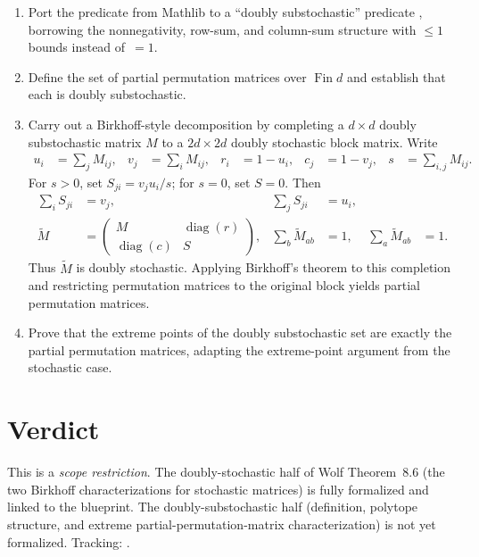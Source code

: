 \documentclass{article}
\begin{document}
\begin{enumerate}
  \item Port the predicate  from Mathlib to a
    ``doubly substochastic'' predicate , borrowing
    the nonnegativity, row-sum, and column-sum structure with $\le 1$ bounds
    instead of~$=1$.
  \item Define the set of partial permutation matrices over
    $\operatorname{Fin} d$ and establish that each is doubly substochastic.
  \item Carry out a Birkhoff-style decomposition by completing a
    $d\times d$ doubly substochastic matrix $M$ to a $2d\times 2d$
    doubly stochastic block matrix.  Write
    \begin{align}
      u_i&=\sum_j M_{ij}, & v_j&=\sum_i M_{ij}, &
      r_i&=1-u_i, & c_j&=1-v_j, & s&=\sum_{i,j}M_{ij}.
    \end{align}
    For $s>0$, set $S_{ji}=v_ju_i/s$; for $s=0$, set $S=0$.  Then
    \begin{align}
      \sum_i S_{ji}&=v_j, & \sum_j S_{ji}&=u_i, \\
      \widetilde M&=
      \begin{pmatrix}M&\operatorname{diag}(r)\\
      \operatorname{diag}(c)&S\end{pmatrix}, &
      \sum_b\widetilde M_{ab}&=1, &
      \sum_a\widetilde M_{ab}&=1.
    \end{align}
    Thus $\widetilde M$ is doubly stochastic.  Applying Birkhoff's theorem
    to this completion and restricting permutation matrices to the original
    block yields partial permutation matrices.
  \item Prove that the extreme points of the doubly substochastic set are
    exactly the partial permutation matrices, adapting the extreme-point
    argument from the stochastic case.
\end{enumerate}

\section{Verdict}

This is a \emph{scope restriction}.  The doubly-stochastic half of Wolf
Theorem~8.6 (the two Birkhoff characterizations for stochastic matrices) is
fully formalized and linked to the blueprint.  The doubly-substochastic half
(definition, polytope structure, and extreme partial-permutation-matrix
characterization) is not yet formalized.  Tracking: .



\end{document}
